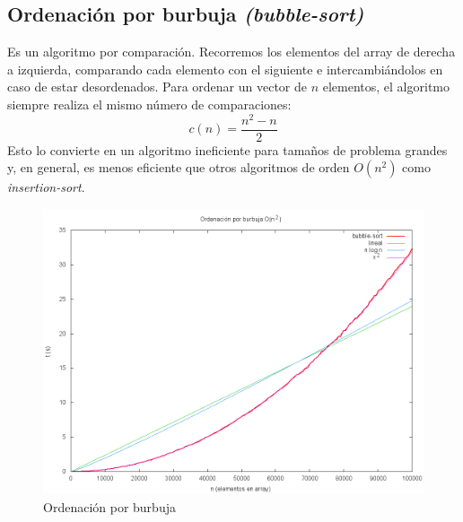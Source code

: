 \subsection{Ordenación por burbuja \textit{(bubble-sort)}}
Es un algoritmo por comparación.  Recorremos los elementos del array de derecha a izquierda, comparando cada elemento con el siguiente e intercambiándolos en caso de estar desordenados.  Para ordenar un vector de $n$ elementos, el algoritmo siempre realiza el mismo número de comparaciones:
\[c(n)=\frac{n^2 - n}{2}\]
Esto lo convierte en un algoritmo ineficiente para tamaños de problema grandes y, en general, es menos eficiente que otros algoritmos de orden $O(n^2)$ como \textit{insertion-sort}.
	\begin{figure}[H]
	  \centering
	    \includegraphics[width=1.0\textwidth]{bubble-sort.png}
	  \caption{Ordenación por burbuja}
	  \label{fig:bubble}
	\end{figure}

